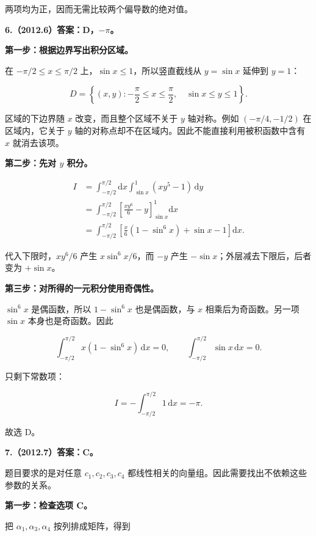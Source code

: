 \documentclass[UTF8,11pt,fontset=windows]{ctexart}
\begin{document}
两项均为正，因而无需比较两个偏导数的绝对值。

\clearpage

\textbf{6.（2012.6）答案：D，$-\pi$。}

\textbf{第一步：根据边界写出积分区域。}

在 $-\pi/2\le x\le\pi/2$ 上，$\sin x\le1$，所以竖直截线从 $y=\sin x$ 延伸到 $y=1$：

$$
D=\left\{(x,y):-\frac\pi2\le x\le\frac\pi2,
\quad\sin x\le y\le1\right\}.
$$

区域的下边界随 $x$ 改变，而且整个区域不关于 $y$ 轴对称。例如 $(-\pi/4,-1/2)$ 在区域内，它关于 $y$ 轴的对称点却不在区域内。因此不能直接利用被积函数中含有 $x$ 就消去该项。

\textbf{第二步：先对 $y$ 积分。}

$$
\begin{aligned}
I
&=\int_{-\pi/2}^{\pi/2}\mathrm dx
  \int_{\sin x}^{1}(xy^5-1)\,\mathrm dy\\
&=\int_{-\pi/2}^{\pi/2}
  \left[\frac{xy^6}{6}-y\right]_{\sin x}^{1}\mathrm dx\\
&=\int_{-\pi/2}^{\pi/2}
  \left[\frac x6(1-\sin^6x)+\sin x-1\right]\mathrm dx.
\end{aligned}
$$

代入下限时，$xy^6/6$ 产生 $x\sin^6x/6$，而 $-y$ 产生 $-\sin x$；外层减去下限后，后者变为 $+\sin x$。

\textbf{第三步：对所得的一元积分使用奇偶性。}

$\sin^6x$ 是偶函数，所以 $1-\sin^6x$ 也是偶函数，与 $x$ 相乘后为奇函数。另一项 $\sin x$ 本身也是奇函数。因此

$$
\int_{-\pi/2}^{\pi/2}x(1-\sin^6x)\,\mathrm dx=0,
\qquad
\int_{-\pi/2}^{\pi/2}\sin x\,\mathrm dx=0.
$$

只剩下常数项：

$$
I=-\int_{-\pi/2}^{\pi/2}1\,\mathrm dx=-\pi.
$$

故选 D。

\clearpage

\textbf{7.（2012.7）答案：C。}

题目要求的是对任意 $c_1,c_2,c_3,c_4$ 都线性相关的向量组。因此需要找出不依赖这些参数的关系。

\textbf{第一步：检查选项 C。}

把 $\alpha_1,\alpha_3,\alpha_4$ 按列排成矩阵，得到
\end{document}
